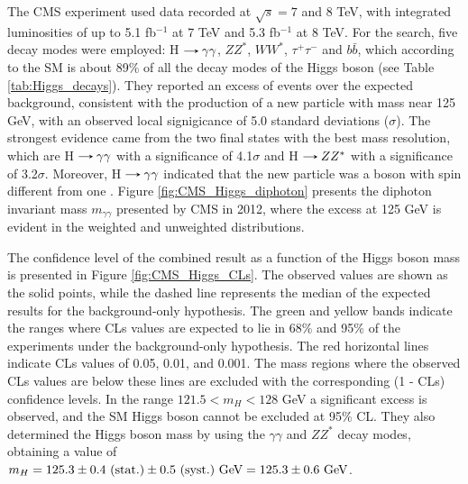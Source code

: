 The CMS experiment used data recorded at $\sqrt{s} = 7$ and 8 TeV, with integrated luminosities of up to 5.1 fb$^{-1}$ at 7 TeV and 5.3 fb$^{-1}$ at 8 TeV. For the search, five decay modes were employed: H$\decaysto\gamma\gamma$, $ZZ^*$, $WW^*$, $\tau^+\tau^-$ and $b\bar{b}$, which according to the SM is about 89\% of all the decay modes of the Higgs boson (see Table \ref{tab:Higgs_decays}). They reported an excess of events over the expected background, consistent with the production of a new particle with mass near 125 GeV, with an observed local signigicance of 5.0 standard deviations ($\sigma$). The strongest evidence came from the two final states with the best mass resolution, which are H$\decaysto\gamma\gamma$ with a significance of 4.1$\sigma$ and H$\decaysto ZZ^*$ with a significance of 3.2$\sigma$. Moreover, H$\decaysto\gamma\gamma$ indicated that the new particle was a boson with spin different from one \cite{CMS:2012qbp}. Figure \ref{fig:CMS_Higgs_diphoton} presents the diphoton invariant mass $m_{\gamma\gamma}$ presented by CMS in 2012, where the excess at 125 GeV is evident in the weighted and unweighted distributions.

The confidence level of the combined result as a function of the Higgs boson mass is presented in Figure \ref{fig:CMS_Higgs_CLs}. The observed values are shown as the solid points, while the dashed line represents the median of the expected results for the background-only hypothesis. The green and yellow bands indicate the ranges where CLs values are expected to lie in 68\% and 95\% of the experiments under the background-only hypothesis. The red horizontal lines indicate CLs values of 0.05, 0.01, and 0.001. The mass regions where the observed CLs values are below these lines are excluded with the corresponding (1 - CLs) confidence levels. In the range $121.5 < m_H < 128$ GeV a significant excess is observed, and the SM Higgs boson cannot be excluded at 95\% CL. They also determined the Higgs boson mass by using the $\gamma\gamma$ and $ZZ^*$ decay modes, obtaining a value of $m_H=125.3\pm0.4\text{ (stat.)}\pm0.5\text{ (syst.)}\ \text{GeV} = 125.3\pm0.6\ \text{GeV}$.

